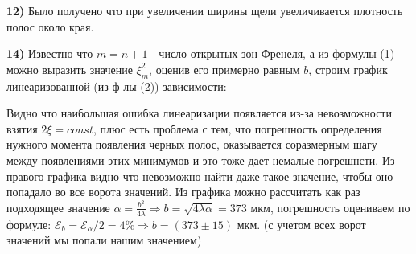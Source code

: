 \documentclass[a4paper,12pt]{extarticle}
\begin{document}
\textbf{12)} Было получено что при увеличении ширины щели увеличивается плотность полос около края.

\textbf{14)} Известно что $m = n + 1$ - число открытых зон Френеля, а из формулы (1) можно выразить значение $\xi^2_m$, оценив его примерно равным $b$, строим график линеаризованной (из ф-лы (2)) зависимости: 

\begin{minipage}{0.45\textwidth}
\end{minipage}
\begin{minipage}{0.45\textwidth}
\end{minipage}

Видно что наибольшая ошибка линеаризации появляется из-за невозможности взятия $2\xi = const$, плюс есть проблема с тем, что погрешность определения нужного момента появления черных полос, оказывается соразмерным шагу между появлениями этих минимумов и это тоже дает немалые погрешнсти. Из правого графика видно что невозможно найти даже такое значение, чтобы оно попадало во все ворота значений. Из графика можно рассчитать как раз подходящее значение $\alpha = \frac{b^2}{4\lambda} \Rightarrow b = \sqrt{4\lambda\alpha} = 373$ мкм, погрешность оцениваем по формуле: $\mathcal{E}_b = \mathcal{E}_{\alpha}/2 = 4\% \Rightarrow b = (373\pm15)$ мкм. (с учетом всех ворот значений мы попали нашим значением)
\end{document}
